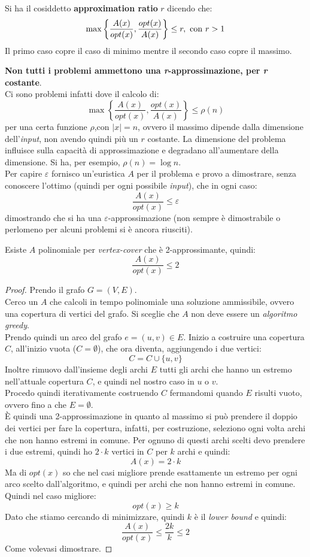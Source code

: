 \begin{definizione}
  Si ha il cosiddetto \textbf{approximation ratio} $r$ dicendo che:
  \[\max\left\{\frac{A(x)}{opt(x)},\frac{opt(x)}{A(x)}\right\}\leq r,\mbox{
      \textnormal{con} }r>1\] 
  Il primo caso copre il caso di minimo mentre il secondo caso copre il massimo.
\end{definizione}
\textbf{Non tutti i problemi ammettono una \textit{r}-approssimazione, per
  \textit{r} costante}.\\
Ci sono problemi infatti dove il calcolo di:
\[\max\left\{\frac{A(x)}{opt(x)},\frac{opt(x)}{A(x)}\right\}\leq \rho(n)\]
per una certa funzione $\rho$,con $|x|=n$,
ovvero il massimo dipende dalla
dimensione dell'\textit{input}, non avendo quindi più un $r$ costante. La dimensione del
problema influisce sulla capacità di approssimazione e degradano all'aumentare
della dimensione. Si ha, per esempio, $\rho(n)=\log n$.\\
Per capire $\varepsilon$ fornisco un'euristica $A$ per il problema e provo a
dimostrare, senza conoscere l'ottimo (quindi per ogni possibile \textit{input}), che in
ogni caso:
\[\frac{A(x)}{opt(x)}\leq \varepsilon\]
dimostrando che si ha una $\varepsilon$-approssimazione (non sempre è
dimostrabile o perlomeno per alcuni problemi si è ancora riusciti).
\begin{teorema}
  Esiste $A$ polinomiale per \textit{vertex-cover} che è 2-approssimante,
  quindi:
  \[\frac{A(x)}{opt(x)}\leq 2\]
\end{teorema}
\begin{proof}
  Prendo il grafo $G=(V,E)$.\\
  Cerco un $A$ che calcoli in tempo polinomiale una soluzione ammissibile,
  ovvero una copertura di vertici del grafo. Si sceglie che $A$ non deve essere
  un \textit{algoritmo greedy}.\\
  Prendo quindi un arco del grafo $e=(u,v)\in E$. Inizio a costruire una
  copertura $C$, all'inizio vuota ($C=\emptyset$), che ora diventa, aggiungendo
  i due vertici:
  \[C=C\cup\{u,v\}\]
  Inoltre rimuovo dall'insieme degli archi $E$ tutti gli archi che hanno un
  estremo nell'attuale copertura $C$, e quindi nel nostro caso in $u$ o $v$.\\
  Procedo quindi iterativamente costruendo $C$ fermandomi quando $E$ risulti
  vuoto, ovvero fino a che $E=\emptyset$.\\
  È quindi una 2-approssimazione in quanto al massimo si può prendere il doppio
  dei vertici per fare la copertura, infatti, per costruzione, seleziono ogni
  volta archi che non hanno estremi in comune. Per ognuno di questi archi scelti
  devo prendere i due estremi, quindi ho $2\cdot k$ vertici in $C$ per $k$ archi
  e quindi:
  \[A(x)=2\cdot k\]
  Ma di $opt(x)$ so che nel casi migliore prende esattamente un estremo per ogni
  arco scelto dall'algoritmo, e quindi per archi che non hanno estremi in
  comune. Quindi nel caso migliore:
  \[opt(x)\geq k\]
  Dato che stiamo cercando di minimizzare, quindi $k$ è il \textit{lower bound} e
  quindi:
  \[\frac{A(x)}{opt(x)}\leq\frac{2k}{k}\leq 2\]
  Come volevasi dimostrare.
\end{proof}
